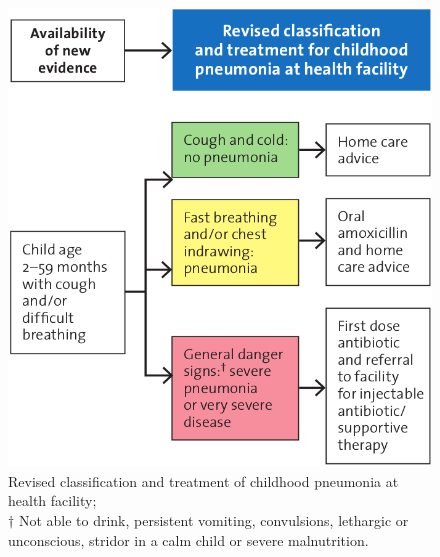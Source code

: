 \documentclass[11pt,a4paper]{report}
\begin{document}
\begin{figure}[htp]
	\centering \includegraphics[scale=0.30]{pneumonia_WHO.png}
	\centering \caption[Childhood pneumonia]{Revised classification and treatment of childhood pneumonia at health facility;\\$\dagger$ Not able to drink, persistent vomiting, convulsions, lethargic or unconscious, stridor in a calm child or severe malnutrition. \cite{revised-who-pneumonia-2014}}
	\label{WHO-Pneumonia}
\end{figure}
\end{document}
